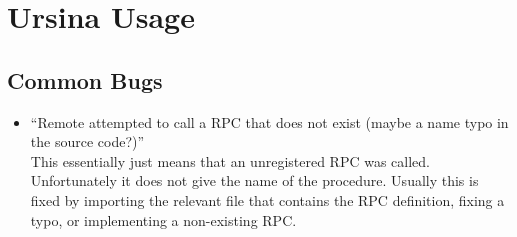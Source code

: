 \documentclass{article}
\begin{document}
\section{Ursina Usage}
\subsection{Common Bugs}
\begin{itemize}
    \item ``Remote attempted to call a RPC that does not exist (maybe a name typo in the source code?)''\\
        This essentially just means that an unregistered RPC was called. Unfortunately it does not give
        the name of the procedure. Usually this is fixed by importing the relevant file that contains the
        RPC definition, fixing a typo, or implementing a non-existing RPC.
\end{itemize}
\end{document}
